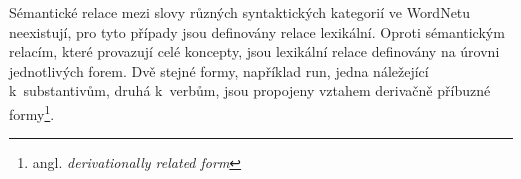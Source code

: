 \documentclass[a4paper,11pt,openany,twoside]{book}
\newcommand{\itNameRef}[1]{\textit{\nameref{#1}}}
\newcommand\ex{\textsf}
\begin{document}
					Sémantické relace mezi slovy různých syntaktických kategorií ve WordNetu neexistují, pro tyto případy jsou definovány relace lexikální. Oproti sémantickým relacím, které provazují celé koncepty, jsou lexikální relace definovány na úrovni jednotlivých forem. Dvě stejné formy, například \ex{run}, jedna náležející k~substantivům, druhá k~verbům, jsou propojeny vztahem derivačně příbuzné formy\footnote{angl. \textit{derivationally related form}}. \parencite{wndocsWNgloss}



\end{document}
